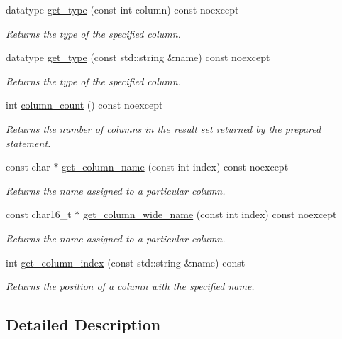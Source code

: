 \begin{DoxyCompactItemize}
datatype \hyperlink{a00010_a2b8269e0f9387afa36ab90eb55899dc4}{get\-\_\-type} (const int column) const noexcept
\begin{DoxyCompactList}\small\item\em Returns the type of the specified column. \end{DoxyCompactList}\item 
datatype \hyperlink{a00010_ac5ab606cf12aa4d2c9a183998420df44}{get\-\_\-type} (const std\-::string \&name) const noexcept
\begin{DoxyCompactList}\small\item\em Returns the type of the specified column. \end{DoxyCompactList}\item 
int \hyperlink{a00010_a7390afddbb1edc788f0afc6ce41f4562}{column\-\_\-count} () const noexcept
\begin{DoxyCompactList}\small\item\em Returns the number of columns in the result set returned by the prepared statement. \end{DoxyCompactList}\item 
const char $\ast$ \hyperlink{a00010_ad4c33f9b700a47c08f54e7b65afd34f2}{get\-\_\-column\-\_\-name} (const int index) const noexcept
\begin{DoxyCompactList}\small\item\em Returns the name assigned to a particular column. \end{DoxyCompactList}\item 
const char16\-\_\-t $\ast$ \hyperlink{a00010_aa7f2f528b10da75672e55fbc36566f9c}{get\-\_\-column\-\_\-wide\-\_\-name} (const int index) const noexcept
\begin{DoxyCompactList}\small\item\em Returns the name assigned to a particular column. \end{DoxyCompactList}\item 
int \hyperlink{a00010_aaca43590a209c2c7a0f7420c8a6c47b3}{get\-\_\-column\-\_\-index} (const std\-::string \&name) const 
\begin{DoxyCompactList}\small\item\em Returns the position of a column with the specified name. \end{DoxyCompactList}\end{DoxyCompactItemize}


\subsection{Detailed Description}
